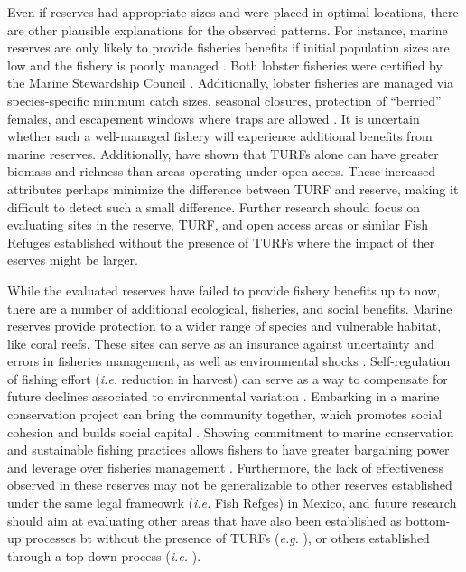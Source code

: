 \documentclass{frontiersSCNS}
\theoremstyle{definition}
\theoremstyle{definition}
\theoremstyle{definition}
\theoremstyle{remark}
\begin{document}
Even if reserves had appropriate sizes and were placed in optimal
locations, there are other plausible explanations for the observed
patterns. For instance, marine reserves are only likely to provide
fisheries benefits if initial population sizes are low and the fishery
is poorly managed \citep{hilborn_2006}. Both lobster fisheries were
certified by the Marine Stewardship Council \citep{prezramrez_2016-J1}.
Additionally, lobster fisheries are managed via species-specific minimum
catch sizes, seasonal closures, protection of ``berried'' females, and
escapement windows where traps are allowed \citep{dof_website_1993}. It
is uncertain whether such a well-managed fishery will experience
additional benefits from marine reserves. Additionally,
\citet{gelcich_2008} have shown that TURFs alone can have greater
biomass and richness than areas operating under open acces. These
increased attributes perhaps minimize the difference between TURF and
reserve, making it difficult to detect such a small difference. Further
research should focus on evaluating sites in the reserve, TURF, and open
access areas or similar Fish Refuges established without the presence of
TURFs where the impact of ther eserves might be larger.

While the evaluated reserves have failed to provide fishery benefits up
to now, there are a number of additional ecological, fisheries, and
social benefits. Marine reserves provide protection to a wider range of
species and vulnerable habitat, like coral reefs. These sites can serve
as an insurance against uncertainty and errors in fisheries management,
as well as environmental shocks
\citep{hilborn_2004,hilborn_2006,micheli_2012-EU,aalto}. Self-regulation
of fishing effort (\emph{i.e.} reduction in harvest) can serve as a way
to compensate for future declines associated to environmental variation
\citep{finkbeiner_2018}. Embarking in a marine conservation project can
bring the community together, which promotes social cohesion and builds
social capital \citep{fulton_2019}. Showing commitment to marine
conservation and sustainable fishing practices allows fishers to have
greater bargaining power and leverage over fisheries management
\citep{prezramrez_2012}. Furthermore, the lack of effectiveness observed
in these reserves may not be generalizable to other reserves established
under the same legal frameowrk (\emph{i.e.} Fish Refges) in Mexico, and
future research should aim at evaluating other areas that have also been
established as bottom-up processes bt without the presence of TURFs
(\emph{e.g.} \citet{dof_websiteC_2012}), or others established through a
top-down process (\emph{i.e.} \citet{dof_websiteU_2018}).
\end{document}
